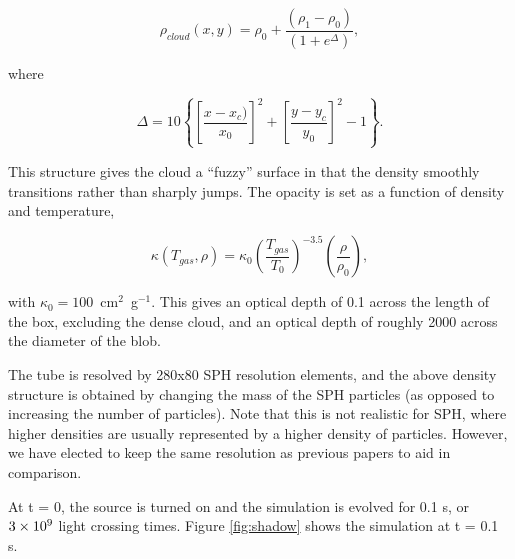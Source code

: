 \begin{equation}
\label{eq:shadowdensity}
\rho_{cloud}(x,y) = \rho_0 + \frac{(\rho_1 - \rho_0)}{(1+e^{\Delta})},
\end{equation}

\noindent
where

\begin{equation}
\label{eq:shadowdelta}
\Delta = 10\left\lbrace\left[\frac{x-x_c)}{x_0}\right]^2 + \left[\frac{y-y_c}{y_0}\right]^2-1\right\rbrace.
\end{equation}

This structure gives the cloud a ``fuzzy'' surface in that the density smoothly transitions rather than sharply jumps. The opacity is set as a function of density and temperature,

\begin{equation}
\label{eq:shadowopacity}
\kappa(T_{gas},\rho) = \kappa_0\left(\frac{T_{gas}}{T_0}\right)^{-3.5}\left(\frac{\rho}{\rho_0}\right),
\end{equation}

\noindent
with $\kappa_0 = 100$~cm$^2$~g$^{-1}$. This gives an optical depth of 0.1 across the length of the box, excluding the dense cloud, and an optical depth of roughly 2000 across the diameter of the blob.

The tube is resolved by 280x80 SPH resolution elements, and the above density structure is obtained by changing the mass of the SPH particles (as opposed to increasing the number of particles). Note that this is not realistic for SPH, where higher densities are usually represented by a higher density of particles. However, we have elected to keep the same resolution as previous papers to aid in comparison.

At t = 0, the source is turned on and the simulation is evolved for 0.1 s, or $3\times 10^{9}$ light crossing times. Figure \ref{fig:shadow} shows the simulation at t = 0.1 s.

